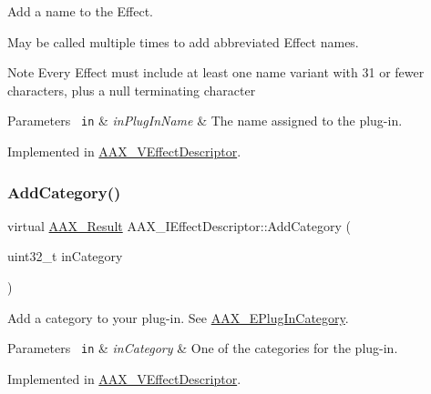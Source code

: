 Add a name to the Effect. 

May be called multiple times to add abbreviated Effect names.

\begin{DoxyNote}{Note}
Every Effect must include at least one name variant with 31 or fewer characters, plus a null terminating character
\end{DoxyNote}

\begin{DoxyParams}[1]{Parameters}
\mbox{\texttt{ in}}  & {\em in\+Plug\+In\+Name} & The name assigned to the plug-\/in. \\
\hline
\end{DoxyParams}


Implemented in \mbox{\hyperlink{a01913_ac52fc7b9a0f8bd5550725c5096aa2926}{A\+A\+X\+\_\+\+V\+Effect\+Descriptor}}.

\mbox{\label{a01813_aeb6683e6758f7eb00f87c153e4809641}} 
\subsubsection{\texorpdfstring{AddCategory()}{AddCategory()}}
{\footnotesize\ttfamily virtual \mbox{\hyperlink{a00392_a4d8f69a697df7f70c3a8e9b8ee130d2f}{A\+A\+X\+\_\+\+Result}} A\+A\+X\+\_\+\+I\+Effect\+Descriptor\+::\+Add\+Category (\begin{DoxyParamCaption}\item[{uint32\+\_\+t}]{in\+Category }\end{DoxyParamCaption})\hspace{0.3cm}{\ttfamily [pure virtual]}}



Add a category to your plug-\/in. See \mbox{\hyperlink{a00491_aef9637518fb1ac0e2f403444c73aba4a}{A\+A\+X\+\_\+\+E\+Plug\+In\+Category}}. 


\begin{DoxyParams}[1]{Parameters}
\mbox{\texttt{ in}}  & {\em in\+Category} & One of the categories for the plug-\/in. \\
\hline
\end{DoxyParams}


Implemented in \mbox{\hyperlink{a01913_af0f874b5d7dd2a89b3c35eb6b73d9f53}{A\+A\+X\+\_\+\+V\+Effect\+Descriptor}}.

\mbox{\label{a01813_a8da96a465f2bd367194067a51a12816d}} 
